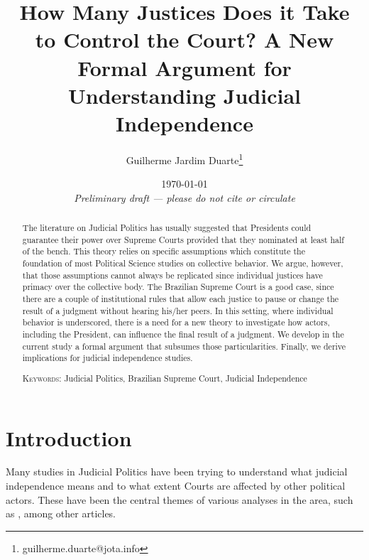 \documentclass[12pt, a4paper]{article}
\title{\textbf{How Many Justices Does it Take to Control the Court?} A New Formal Argument for Understanding Judicial Independence}
\author{Guilherme Jardim Duarte\thanks{guilherme.duarte@jota.info}}
\date{\vspace{.5cm} \today \\ 
\vspace{.5cm} \textit{Preliminary draft --- please do not cite or circulate}}
\begin{document}
\doublespacing
\maketitle

\begin{abstract}


The literature on Judicial Politics has usually suggested that 
Presidents could guarantee their power over Supreme 
Courts provided that they nominated at least 
half of the bench. This theory relies on specific assumptions which
constitute the foundation of most Political Science studies 
on collective behavior. We argue, however, that those 
assumptions cannot always be replicated since individual justices 
have primacy over the collective body. The Brazilian Supreme Court 
is a good case, since there are a couple of institutional rules that allow
each justice to pause or change the result of a judgment 
without hearing his/her peers. In this setting, where 
individual behavior is underscored, there is a need for
a new theory to investigate how actors, including the President, can
influence the final result of a judgment. We develop in the current 
study a formal argument that subsumes those particularities. 
Finally, we derive implications for judicial independence studies. 


\vspace{.5cm}
\noindent
\textsc{Keywords}: Judicial Politics, Brazilian Supreme Court, Judicial Independence
\end{abstract}

\newpage

	\doublespacing

\section{Introduction}
  

Many studies in Judicial Politics have been trying 
to understand what judicial independence means and 
to what extent Courts are affected by other 
political actors. These have been the central themes 
of various analyses in the area, such as 
\citet{ferejohn1998independent,hanssen2004there,helmke2009regimes,
helmke2014inducing,ginsburg2014does}, among other  articles. 
\end{document}
